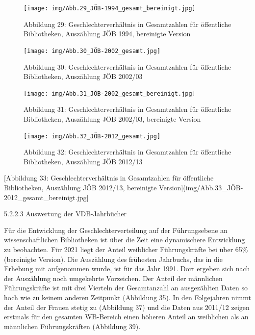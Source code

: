 \documentclass[a4paper,
fontsize=11pt,
oneside,
numbers=noperiodatend,
parskip=half-,
bibliography=totoc,
final
]{scrartcl}
\begin{document}
\begin{figure}
\centering
\texttt{[image: img/Abb.29\_JÖB-1994\_gesamt\_bereinigt.jpg]}
\caption{Abbildung 29: Geschlechterverhältnis in Gesamtzahlen für
öffentliche Bibliotheken, Auszählung JÖB 1994, bereinigte Version}
\end{figure}

\begin{figure}
\centering
\texttt{[image: img/Abb.30\_JÖB-2002\_gesamt.jpg]}
\caption{Abbildung 30: Geschlechterverhältnis in Gesamtzahlen für
öffentliche Bibliotheken, Auszählung JÖB 2002/03}
\end{figure}

\begin{figure}
\centering
\texttt{[image: img/Abb.31\_JÖB-2002\_gesamt\_bereinigt.jpg]}
\caption{Abbildung 31: Geschlechterverhältnis in Gesamtzahlen für
öffentliche Bibliotheken, Auszählung JÖB 2002/03, bereinigte Version}
\end{figure}

\begin{figure}
\centering
\texttt{[image: img/Abb.32\_JÖB-2012\_gesamt.jpg]}
\caption{Abbildung 32: Geschlechterverhältnis in Gesamtzahlen für
öffentliche Bibliotheken, Auszählung JÖB 2012/13}
\end{figure}

{[}Abbildung 33: Geschlechterverhältnis in Gesamtzahlen für öffentliche
Bibliotheken, Auszählung JÖB 2012/13, bereinigte
Version{]}(img/Abb.33\_JÖB-2012\_gesamt\_bereinigt.jpg{]}

5.2.2.3 Auswertung der VDB-Jahrbücher

Für die Entwicklung der Geschlechterverteilung auf der Führungsebene an
wissenschaftlichen Bibliotheken ist über die Zeit eine dynamischere
Entwicklung zu beobachten. Für 2021 liegt der Anteil weiblicher
Führungskräfte bei über 65\% (bereinigte Version). Die Auszählung des
frühesten Jahrbuchs, das in die Erhebung mit aufgenommen wurde, ist für
das Jahr 1991. Dort ergeben sich nach der Auszählung noch umgekehrte
Vorzeichen. Der Anteil der männlichen Führungskräfte ist mit drei
Vierteln der Gesamtanzahl an ausgezählten Daten so hoch wie zu keinem
anderen Zeitpunkt (Abbildung 35). In den Folgejahren nimmt der Anteil
der Frauen stetig zu (Abbildung 37) und die Daten aus 2011/12 zeigen
erstmals für den gesamten WB-Bereich einen höheren Anteil an weiblichen
als an männlichen Führungskräften (Abbildung 39).
\end{document}
